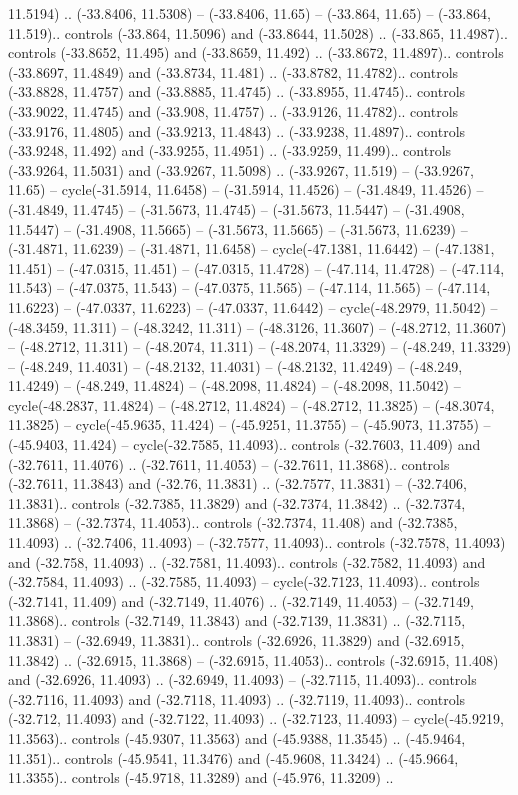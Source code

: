 \begin{scope}[shift={(2.5552, 9.9912)}]
\begin{scope}[shift={(48.1654, -14.8546)}]
11.5194) .. (-33.8406, 11.5308) -- (-33.8406, 11.65) -- (-33.864, 11.65) -- (-33.864, 11.519).. controls (-33.864, 11.5096) and (-33.8644, 11.5028) .. (-33.865, 11.4987).. controls (-33.8652, 11.495) and (-33.8659, 11.492) .. (-33.8672, 11.4897).. controls (-33.8697, 11.4849) and (-33.8734, 11.481) .. (-33.8782, 11.4782).. controls (-33.8828, 11.4757) and (-33.8885, 11.4745) .. (-33.8955, 11.4745).. controls (-33.9022, 11.4745) and (-33.908, 11.4757) .. (-33.9126, 11.4782).. controls (-33.9176, 11.4805) and (-33.9213, 11.4843) .. (-33.9238, 11.4897).. controls (-33.9248, 11.492) and (-33.9255, 11.4951) .. (-33.9259, 11.499).. controls (-33.9264, 11.5031) and (-33.9267, 11.5098) .. (-33.9267, 11.519) -- (-33.9267, 11.65) -- cycle(-31.5914, 11.6458) -- (-31.5914, 11.4526) -- (-31.4849, 11.4526) -- (-31.4849, 11.4745) -- (-31.5673, 11.4745) -- (-31.5673, 11.5447) -- (-31.4908, 11.5447) -- (-31.4908, 11.5665) -- (-31.5673, 11.5665) -- (-31.5673, 11.6239) -- (-31.4871, 11.6239) -- (-31.4871, 11.6458) -- cycle(-47.1381, 11.6442) -- (-47.1381, 11.451) -- (-47.0315, 11.451) -- (-47.0315, 11.4728) -- (-47.114, 11.4728) -- (-47.114, 11.543) -- (-47.0375, 11.543) -- (-47.0375, 11.565) -- (-47.114, 11.565) -- (-47.114, 11.6223) -- (-47.0337, 11.6223) -- (-47.0337, 11.6442) -- cycle(-48.2979, 11.5042) -- (-48.3459, 11.311) -- (-48.3242, 11.311) -- (-48.3126, 11.3607) -- (-48.2712, 11.3607) -- (-48.2712, 11.311) -- (-48.2074, 11.311) -- (-48.2074, 11.3329) -- (-48.249, 11.3329) -- (-48.249, 11.4031) -- (-48.2132, 11.4031) -- (-48.2132, 11.4249) -- (-48.249, 11.4249) -- (-48.249, 11.4824) -- (-48.2098, 11.4824) -- (-48.2098, 11.5042) -- cycle(-48.2837, 11.4824) -- (-48.2712, 11.4824) -- (-48.2712, 11.3825) -- (-48.3074, 11.3825) -- cycle(-45.9635, 11.424) -- (-45.9251, 11.3755) -- (-45.9073, 11.3755) -- (-45.9403, 11.424) -- cycle(-32.7585, 11.4093).. controls (-32.7603, 11.409) and (-32.7611, 11.4076) .. (-32.7611, 11.4053) -- (-32.7611, 11.3868).. controls (-32.7611, 11.3843) and (-32.76, 11.3831) .. (-32.7577, 11.3831) -- (-32.7406, 11.3831).. controls (-32.7385, 11.3829) and (-32.7374, 11.3842) .. (-32.7374, 11.3868) -- (-32.7374, 11.4053).. controls (-32.7374, 11.408) and (-32.7385, 11.4093) .. (-32.7406, 11.4093) -- (-32.7577, 11.4093).. controls (-32.7578, 11.4093) and (-32.758, 11.4093) .. (-32.7581, 11.4093).. controls (-32.7582, 11.4093) and (-32.7584, 11.4093) .. (-32.7585, 11.4093) -- cycle(-32.7123, 11.4093).. controls (-32.7141, 11.409) and (-32.7149, 11.4076) .. (-32.7149, 11.4053) -- (-32.7149, 11.3868).. controls (-32.7149, 11.3843) and (-32.7139, 11.3831) .. (-32.7115, 11.3831) -- (-32.6949, 11.3831).. controls (-32.6926, 11.3829) and (-32.6915, 11.3842) .. (-32.6915, 11.3868) -- (-32.6915, 11.4053).. controls (-32.6915, 11.408) and (-32.6926, 11.4093) .. (-32.6949, 11.4093) -- (-32.7115, 11.4093).. controls (-32.7116, 11.4093) and (-32.7118, 11.4093) .. (-32.7119, 11.4093).. controls (-32.712, 11.4093) and (-32.7122, 11.4093) .. (-32.7123, 11.4093) -- cycle(-45.9219, 11.3563).. controls (-45.9307, 11.3563) and (-45.9388, 11.3545) .. (-45.9464, 11.351).. controls (-45.9541, 11.3476) and (-45.9608, 11.3424) .. (-45.9664, 11.3355).. controls (-45.9718, 11.3289) and (-45.976, 11.3209) .. 
\end{scope}
\end{scope}
